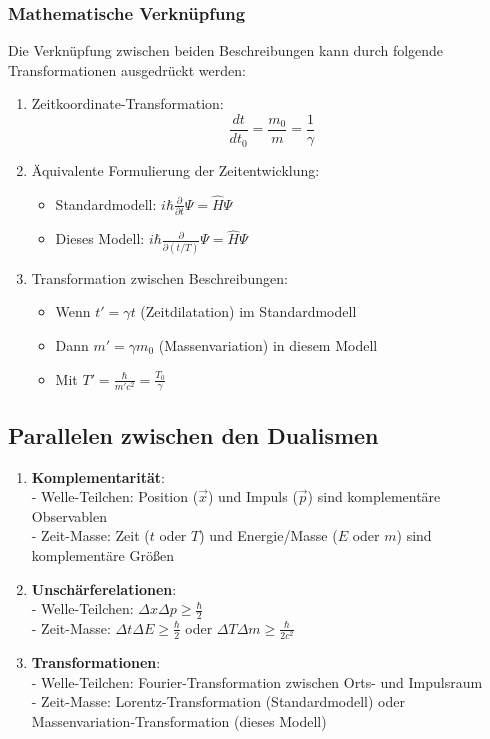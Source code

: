 \documentclass[a4paper,12pt]{article}
\begin{document}
	\subsubsection{Mathematische Verknüpfung}
	Die Verknüpfung zwischen beiden Beschreibungen kann durch folgende Transformationen ausgedrückt werden:
	\begin{enumerate}
		\item Zeitkoordinate-Transformation:
		\[
		\frac{dt}{dt_0} = \frac{m_0}{m} = \frac{1}{\gamma}
		\]
		\item Äquivalente Formulierung der Zeitentwicklung:
		\begin{itemize}
			\item Standardmodell: \( i\hbar\frac{\partial}{\partial t}\Psi = \hat{H}\Psi \)
			\item Dieses Modell: \( i\hbar\frac{\partial}{\partial (t/T)}\Psi = \hat{H}\Psi \)
		\end{itemize}
		\item Transformation zwischen Beschreibungen:
		\begin{itemize}
			\item Wenn \( t' = \gamma t \) (Zeitdilatation) im Standardmodell
			\item Dann \( m' = \gamma m_0 \) (Massenvariation) in diesem Modell
			\item Mit \( T' = \frac{\hbar}{m'c^2} = \frac{T_0}{\gamma} \)
		\end{itemize}
	\end{enumerate}
	
	\subsection{Parallelen zwischen den Dualismen}
	\begin{enumerate}
		\item \textbf{Komplementarität}: \\
		- Welle-Teilchen: Position (\( \vec{x} \)) und Impuls (\( \vec{p} \)) sind komplementäre Observablen \\
		- Zeit-Masse: Zeit (\( t \) oder \( T \)) und Energie/Masse (\( E \) oder \( m \)) sind komplementäre Größen
		\item \textbf{Unschärferelationen}: \\
		- Welle-Teilchen: \( \Delta x \Delta p \geq \frac{\hbar}{2} \) \\
		- Zeit-Masse: \( \Delta t \Delta E \geq \frac{\hbar}{2} \) oder \( \Delta T \Delta m \geq \frac{\hbar}{2c^2} \)
		\item \textbf{Transformationen}: \\
		- Welle-Teilchen: Fourier-Transformation zwischen Orts- und Impulsraum \\
		- Zeit-Masse: Lorentz-Transformation (Standardmodell) oder Massenvariation-Transformation (dieses Modell)
	\end{enumerate}
	
\end{document}
